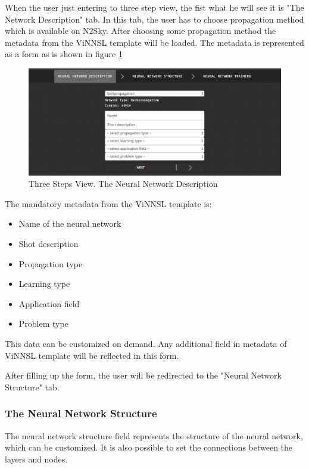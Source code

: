 When the user just entering to three step view, the fist what he will see it is "The Network Description" tab. In this tab, the user has to choose propagation method which is available on N2Sky. After choosing some propagation method the metadata from the ViNNSL template will be loaded. The metadata is represented as a form as is shown in figure \ref{fig:nn_desc_3_steps}

\begin{figure}[H]
\begin{center}
  \includegraphics[width=\linewidth]{components/5/img/nn_desc_3_steps.png}
  \caption{Three Steps View. The Neural Network Description}
  \label{fig:nn_desc_3_steps}
\end{center}
\end{figure}

The mandatory metadata from the ViNNSL template is:
\begin{itemize}
\item Name of the neural network
\item Shot description
\item Propagation type
\item Learning type
\item Application field
\item Problem type
\end{itemize}

This data can be customized on demand. Any additional field in metadata of ViNNSL template will be reflected in this form.


After filling up the form, the user will be redirected to the "Neural Network Structure" tab.

\subsubsection{The Neural Network Structure}

The neural network structure field represents the structure of the neural network, which can be customized. It is also possible to set the connections between the layers and nodes. 

